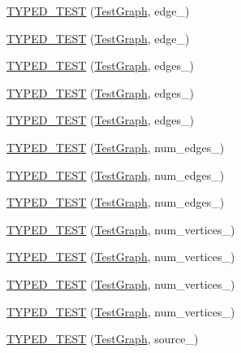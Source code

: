 \begin{DoxyCompactItemize}
\item 
\hyperlink{TestGraph_8c_09_09_aad4343580eecd66e01fbfa72fc187be2}{T\-Y\-P\-E\-D\-\_\-\-T\-E\-S\-T} (\hyperlink{structTestGraph}{Test\-Graph}, edge\-\_)
\item 
\hyperlink{TestGraph_8c_09_09_a90edf01026cf16dac993c6a6e140aaa3}{T\-Y\-P\-E\-D\-\_\-\-T\-E\-S\-T} (\hyperlink{structTestGraph}{Test\-Graph}, edge\-\_)
\item 
\hyperlink{TestGraph_8c_09_09_a9493a0d1f567d7558cd314493729f970}{T\-Y\-P\-E\-D\-\_\-\-T\-E\-S\-T} (\hyperlink{structTestGraph}{Test\-Graph}, edges\-\_)
\item 
\hyperlink{TestGraph_8c_09_09_af87ba0f65937bbe791cd293d33e396f6}{T\-Y\-P\-E\-D\-\_\-\-T\-E\-S\-T} (\hyperlink{structTestGraph}{Test\-Graph}, edges\-\_)
\item 
\hyperlink{TestGraph_8c_09_09_a8826c3ba737abbf42008031e0f4ea825}{T\-Y\-P\-E\-D\-\_\-\-T\-E\-S\-T} (\hyperlink{structTestGraph}{Test\-Graph}, edges\-\_)
\item 
\hyperlink{TestGraph_8c_09_09_ac4721f35b1c6b4abe5077658583699d1}{T\-Y\-P\-E\-D\-\_\-\-T\-E\-S\-T} (\hyperlink{structTestGraph}{Test\-Graph}, num\-\_\-edges\-\_)
\item 
\hyperlink{TestGraph_8c_09_09_a10b5de405692802242cb86c40eeaa4dd}{T\-Y\-P\-E\-D\-\_\-\-T\-E\-S\-T} (\hyperlink{structTestGraph}{Test\-Graph}, num\-\_\-edges\-\_)
\item 
\hyperlink{TestGraph_8c_09_09_a3f03d716c6d5ea85c635f45fd4b250a1}{T\-Y\-P\-E\-D\-\_\-\-T\-E\-S\-T} (\hyperlink{structTestGraph}{Test\-Graph}, num\-\_\-edges\-\_)
\item 
\hyperlink{TestGraph_8c_09_09_a38ddfb80aeab11d5f9f96e301636dc8f}{T\-Y\-P\-E\-D\-\_\-\-T\-E\-S\-T} (\hyperlink{structTestGraph}{Test\-Graph}, num\-\_\-vertices\-\_)
\item 
\hyperlink{TestGraph_8c_09_09_a45508ab23064846bef4aa8b665e1fc28}{T\-Y\-P\-E\-D\-\_\-\-T\-E\-S\-T} (\hyperlink{structTestGraph}{Test\-Graph}, num\-\_\-vertices\-\_)
\item 
\hyperlink{TestGraph_8c_09_09_afd8bb41ac894f28c3e65a943fdda9058}{T\-Y\-P\-E\-D\-\_\-\-T\-E\-S\-T} (\hyperlink{structTestGraph}{Test\-Graph}, num\-\_\-vertices\-\_)
\item 
\hyperlink{TestGraph_8c_09_09_ad5b455f84e90315d59d297f6683ba49c}{T\-Y\-P\-E\-D\-\_\-\-T\-E\-S\-T} (\hyperlink{structTestGraph}{Test\-Graph}, num\-\_\-vertices\-\_)
\item 
\hyperlink{TestGraph_8c_09_09_a357f69e0c65ffe837c1a50cc9abf4446}{T\-Y\-P\-E\-D\-\_\-\-T\-E\-S\-T} (\hyperlink{structTestGraph}{Test\-Graph}, source\-\_)

\end{DoxyCompactItemize}
